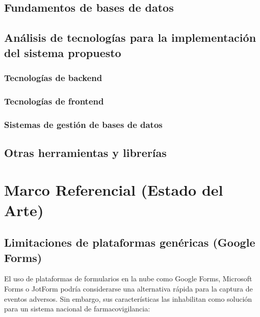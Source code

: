 \subsection{Fundamentos de bases de datos}


\subsection{Análisis de tecnologías para la implementación del sistema propuesto}

\subsubsection{Tecnologías de backend}

\subsubsection{Tecnologías de frontend}

\subsubsection{Sistemas de gestión de bases de datos}

\subsection{Otras herramientas y librerías}



\section{Marco Referencial (Estado del Arte)}

\subsection{Limitaciones de plataformas genéricas (Google Forms)}

El uso de plataformas de formularios en la nube como Google Forms, Microsoft Forms o JotForm podría considerarse una alternativa rápida para la captura de eventos adversos. Sin embargo, sus características las inhabilitan como solución para un sistema nacional de farmacovigilancia:

